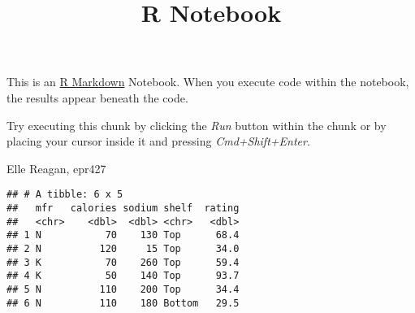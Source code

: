 \documentclass[]{article}
\title{R Notebook}
\author{}
\date{\vspace{-2.5em}}
\newenvironment{Shaded}{\begin{snugshade}}{\end{snugshade}}
\newcommand{\CommentTok}[1]{\textcolor[rgb]{0.56,0.35,0.01}{\textit{#1}}}
\newcommand{\DataTypeTok}[1]{\textcolor[rgb]{0.13,0.29,0.53}{#1}}
\newcommand{\DecValTok}[1]{\textcolor[rgb]{0.00,0.00,0.81}{#1}}
\newcommand{\KeywordTok}[1]{\textcolor[rgb]{0.13,0.29,0.53}{\textbf{#1}}}
\newcommand{\NormalTok}[1]{#1}
\newcommand{\OperatorTok}[1]{\textcolor[rgb]{0.81,0.36,0.00}{\textbf{#1}}}
\newcommand{\StringTok}[1]{\textcolor[rgb]{0.31,0.60,0.02}{#1}}
\begin{document}
\maketitle

This is an \href{http://rmarkdown.rstudio.com}{R Markdown} Notebook.
When you execute code within the notebook, the results appear beneath
the code.

Try executing this chunk by clicking the \emph{Run} button within the
chunk or by placing your cursor inside it and pressing
\emph{Cmd+Shift+Enter}.

Elle Reagan, epr427

\begin{Shaded}
\end{Shaded}

\begin{verbatim}
## # A tibble: 6 x 5
##   mfr   calories sodium shelf  rating
##   <chr>    <dbl>  <dbl> <chr>   <dbl>
## 1 N           70    130 Top      68.4
## 2 N          120     15 Top      34.0
## 3 K           70    260 Top      59.4
## 4 K           50    140 Top      93.7
## 5 N          110    200 Top      34.4
## 6 N          110    180 Bottom   29.5
\end{verbatim}
\end{document}
